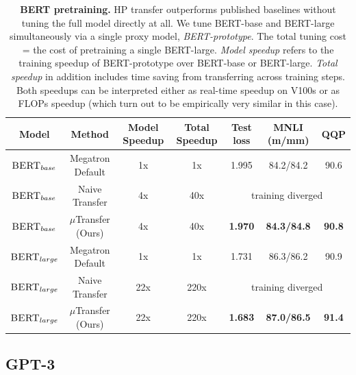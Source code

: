 \documentclass{article}
\theoremstyle{definition}
\begin{document}
\begin{table}[tph]
    \centering
    \small
    \caption[$\mu$Transfer results for BERT pretraining]{\textbf{BERT pretraining.}
    HP transfer outperforms published baselines without tuning the full model directly at all.
    We tune BERT-base and BERT-large simultaneously via a single proxy model, \emph{BERT-prototype}.
    The total tuning cost = the cost of pretraining a single BERT-large.
    \emph{Model speedup} refers to the training speedup of BERT-prototype over BERT-base or BERT-large.
    \emph{Total speedup} in addition includes time saving from transferring across training steps.
    Both speedups can be interpreted either as real-time speedup on V100s or as FLOPs speedup (which turn out to be empirically very similar in this case).
    }
    \begin{tabular}{ccccccc} \toprule
         Model                     & Method            & Model Speedup   & Total Speedup & Test loss & MNLI (m/mm) & QQP \\ \midrule
         $\textsc{BERT}_{base}$    & Megatron Default  &  1x              &  1x              & 1.995     &     84.2/84.2    & 90.6    \\
         $\textsc{BERT}_{base}$    & Naive Transfer    &  4x              &  40x              & \multicolumn{3}{c}{training diverged}   \\
          $\textsc{BERT}_{base}$    & $\mu$Transfer (Ours)        &  4x              &  40x              & \textbf{1.970}    & \textbf{84.3/84.8} & \textbf{90.8}   \\ \midrule
         $\textsc{BERT}_{large}$   & Megatron Default  &  1x              &  1x              & 1.731     &         86.3/86.2    & 90.9\\
          $\textsc{BERT}_{large}$   & Naive Transfer   &  22x             &  220x              & \multicolumn{3}{c}{training diverged}\\ 
         $\textsc{BERT}_{large}$   & $\mu$Transfer (Ours)         &  22x             &  220x              & \textbf{1.683}      &   \textbf{87.0/86.5} & \textbf{91.4}\\ \bottomrule
    \end{tabular}
    \label{tab: large_scale_LM}
\end{table}

\subsection{GPT-3}
\end{document}
